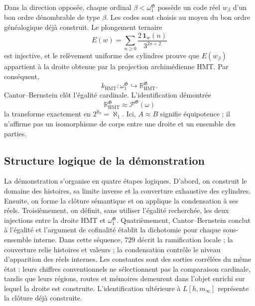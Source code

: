 Dans la direction opposée, chaque ordinal \(\beta<\omega_1^{\mathfrak G}\) possède un code réel \(w_\beta\) d'un bon ordre dénombrable de type \(\beta\). Les codes sont choisis au moyen du bon ordre généalogique déjà construit. Le plongement ternaire
\[
 E(w)=\sum_{n\geq0}\frac{2\,\mathbf 1_w(n)}{3^{2n+2}}
\]
est injective, et le relèvement uniforme des cylindres prouve que
\(E(w_\beta)\) appartient à la droite obtenue par la projection archimédienne HMT. Par conséquent,
\[
 k_{\mathrm{HMT}}:
 \omega_1^{\mathfrak G}
 \hookrightarrow\mathbb R_{\mathrm{HMT}}^{\mathfrak G}.
\]
Cantor--Bernstein clôt l’égalité cardinale. L’identification démontrée
\[
 \mathbb R_{\mathrm{HMT}}^{\mathfrak G}
 \approx\mathcal P^{\mathfrak G}(\omega)
\]
la transforme exactement en \(2^{\aleph_0}=\aleph_1\). Ici, \(A\approx B\) signifie équipotence ; il n'affirme pas un isomorphisme de corps entre une droite et un ensemble des parties.

\clearpage
\subsection{Structure logique de la démonstration}

La démonstration s’organise en quatre étapes logiques. D’abord, on construit le
domaine des histoires, sa limite inverse et la couverture exhaustive des cylindres.
Ensuite, on forme la clôture sémantique et on applique la condensation à ses réels.
Troisièmement, on définit, sans utiliser l’égalité recherchée, les deux injections entre la
droite HMT et \(\omega_1^{\mathfrak G}\). Quatrièmement, Cantor--Bernstein conclut à
l’égalité et l’argument de cofinalité établit la dichotomie pour chaque
sous-ensemble interne. Dans cette séquence, \(729\) décrit la ramification locale ;
la couverture relie histoires et valeurs ; la condensation contrôle le niveau
d’apparition des réels internes. Les constantes sont des sorties
corrélées du même état : leurs chiffres conventionnels ne sélectionnent pas la
comparaison cardinale, tandis que leurs régions, routes et mémoires demeurent dans
l’objet enrichi sur lequel la droite est construite.
L’identification ultérieure à \(L[h,m_\infty]\) représente la clôture déjà
construite.

